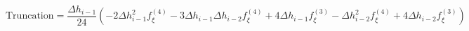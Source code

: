\begin{equation} 
\text{Truncation} = \frac{\Delta h_{{i-1}}}{24} \left(- 2 \Delta h_{{i-1}}^{2} f^{{(4)}}_{{\xi}} - 3 \Delta h_{{i-1}} \Delta h_{{i-2}} f^{{(4)}}_{{\xi}} + 4 \Delta h_{{i-1}} f^{{(3)}}_{{\xi}} - \Delta h_{{i-2}}^{2} f^{{(4)}}_{{\xi}} + 4 \Delta h_{{i-2}} f^{{(3)}}_{{\xi}}\right)
 \end{equation}